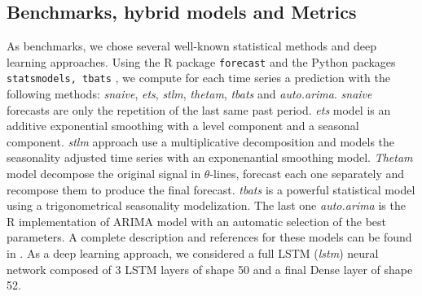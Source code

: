 \documentclass{article} %
\begin{document}




\subsection{Benchmarks, hybrid models and Metrics}

As benchmarks, we chose several well-known statistical methods and deep learning approaches. Using the R package \texttt{forecast} and the Python packages \texttt{statsmodels, tbats} , we compute for each time series a prediction with the following methods: \textit{snaive}, \textit{ets}, \textit{stlm}, \textit{thetam}, \textit{tbats} and \textit{auto.arima}. \textit{snaive} forecasts are only the repetition of the last same past period. \textit{ets} model is an additive exponential smoothing with a level component and a seasonal component. \textit{stlm} approach use a multiplicative decomposition and models the seasonality adjusted time series with an exponenantial smoothing model. \textit{Thetam} model decompose the original signal in $\theta$-lines, forecast each one separately and recompose them to produce the final forecast. \textit{tbats} is a powerful statistical model using a trigonometrical seasonality modelization. The last one \textit{auto.arima} is the R implementation of ARIMA model with an automatic selection of the best parameters. A complete description and references for these models can be found in \citep{packageforecast}. As a deep learning approach, we considered a full LSTM (\textit{lstm}) neural network composed of 3 LSTM layers of shape 50 and a final Dense layer of shape 52.
\end{document}
